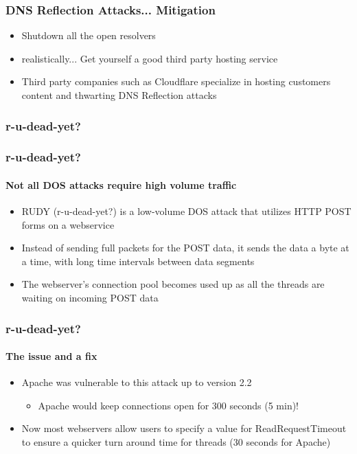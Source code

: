 \documentclass{beamer}
\begin{document}

\begin{frame}
	\frametitle{DNS Reflection Attacks... Mitigation}
	\begin{itemize}
		\item Shutdown all the open resolvers
			\pause
		\item realistically...
			\pause
			Get yourself a good third party hosting service
			\pause
		\item Third party companies such as Cloudflare specialize in hosting customers
			content and thwarting DNS Reflection attacks
	\end{itemize}
\end{frame}

\begin{frame}
	\frametitle{r-u-dead-yet?}
\end{frame}

\begin{frame}
	\frametitle{r-u-dead-yet?}
	\framesubtitle{Not all DOS attacks require high volume traffic}
	\begin{itemize}
		\item RUDY (r-u-dead-yet?) is a low-volume DOS attack that utilizes HTTP
			POST forms on a webservice
		\item Instead of sending full packets for the POST data, it sends the data a
			byte at a time, with long time intervals between data segments
		\item The webserver's connection pool becomes used up as all the threads are
			waiting on incoming POST data
	\end{itemize}
\end{frame}

\begin{frame}
	\frametitle{r-u-dead-yet?}
	\framesubtitle{The issue and a fix}
	\begin{itemize}
		\item Apache was vulnerable to this attack up to version 2.2 
			\begin{itemize}
				\item Apache would keep connections open for 300 seconds (5 min)!
			\end{itemize}
		\item Now most webservers allow users to specify a value for
			{\ttfamily ReadRequestTimeout} to ensure a quicker turn around time for
			threads  (30 seconds for Apache)
	\end{itemize}
\end{frame}
\end{document}
